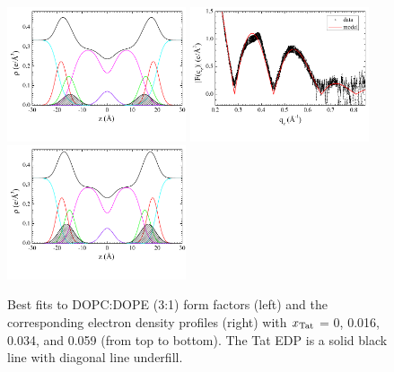 \begin{figure}[htbp]
  \includegraphics[trim=5 30 0 0,clip=true,width=0.47\textwidth]{figures/Tat/SDP_Results/EDP/DOPCDOPE3to1_Tat_28to1_3p0_EDP1}
  \includegraphics[trim=5 30 0 0,clip=true,width=0.47\textwidth]{figures/Tat/SDP_Results/XFF/DOPCDOPE3to1_Tat_16to1_3p0_XFF1}
  \includegraphics[trim=5 30 0 0,clip=true,width=0.47\textwidth]{figures/Tat/SDP_Results/EDP/DOPCDOPE3to1_Tat_16to1_3p0_EDP1} 
  \caption[Best fits to DOPC:DOPE (3:1) form factors (left) and the corresponding 
  electron density profiles (right) with $\xTat$ = 0, 0.016, 0.034, 
  and 0.059 (from top to bottom)]
  {Best fits to DOPC:DOPE (3:1) form factors (left) and the corresponding 
  electron density profiles (right) with $\xTat$ = 0, 0.016, 0.034, 
  and 0.059 (from top to bottom).
  The Tat EDP is a solid black line with diagonal line underfill.}
  \label{fig:DOPCDOPE3to1_Tat_XFF1}
\end{figure}

